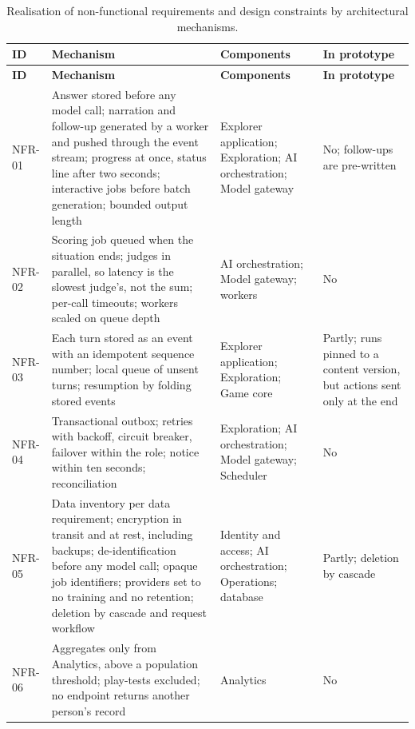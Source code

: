 {\small
\begin{longtable}{|>{\raggedright\arraybackslash}p{}|>{\raggedright\arraybackslash}p{}|>{\raggedright\arraybackslash}p{}|>{\raggedright\arraybackslash}p{}|}
\caption{Realisation of non-functional requirements and design constraints by architectural mechanisms.} \\
\hline
\textbf{ID} & \textbf{Mechanism} & \textbf{Components} & \textbf{In prototype} \\ \hline
\endfirsthead
\hline
\textbf{ID} & \textbf{Mechanism} & \textbf{Components} & \textbf{In prototype} \\ \hline
\endhead
NFR-01 & Answer stored before any model call; narration and follow-up generated by a worker and pushed through the event stream; progress at once, status line after two seconds; interactive jobs before batch generation; bounded output length & Explorer application; Exploration; AI orchestration; Model gateway & No; follow-ups are pre-written \\ \hline
NFR-02 & Scoring job queued when the situation ends; judges in parallel, so latency is the slowest judge's, not the sum; per-call timeouts; workers scaled on queue depth & AI orchestration; Model gateway; workers & No \\ \hline
NFR-03 & Each turn stored as an event with an idempotent sequence number; local queue of unsent turns; resumption by folding stored events & Explorer application; Exploration; Game core & Partly; runs pinned to a content version, but actions sent only at the end \\ \hline
NFR-04 & Transactional outbox; retries with backoff, circuit breaker, failover within the role; notice within ten seconds; reconciliation & Exploration; AI orchestration; Model gateway; Scheduler & No \\ \hline
NFR-05 & Data inventory per data requirement; encryption in transit and at rest, including backups; de-identification before any model call; opaque job identifiers; providers set to no training and no retention; deletion by cascade and request workflow & Identity and access; AI orchestration; Operations; database & Partly; deletion by cascade \\ \hline
NFR-06 & Aggregates only from Analytics, above a population threshold; play-tests excluded; no endpoint returns another person's record & Analytics & No \\ \hline

\end{longtable}}
